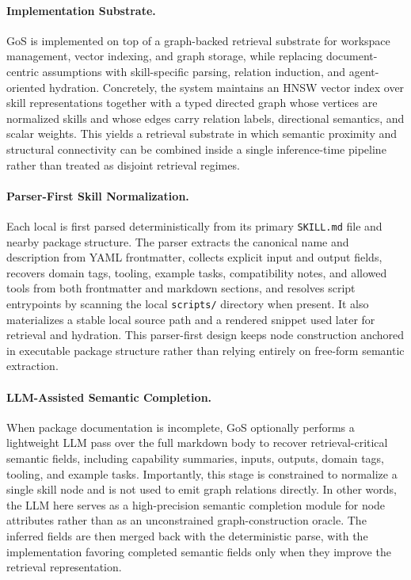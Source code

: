 \paragraph{Implementation Substrate.}
GoS is implemented on top of a graph-backed retrieval substrate for workspace management, vector indexing, and graph storage, while replacing document-centric assumptions with skill-specific parsing, relation induction, and agent-oriented hydration. Concretely, the system maintains an HNSW vector index over skill representations together with a typed directed graph whose vertices are normalized skills and whose edges carry relation labels, directional semantics, and scalar weights. This yields a retrieval substrate in which semantic proximity and structural connectivity can be combined inside a single inference-time pipeline rather than treated as disjoint retrieval regimes.

\paragraph{Parser-First Skill Normalization.}
Each local \skillpackage{} is first parsed deterministically from its primary \texttt{SKILL.md} file and nearby package structure. The parser extracts the canonical name and description from YAML frontmatter, collects explicit input and output fields, recovers domain tags, tooling, example tasks, compatibility notes, and allowed tools from both frontmatter and markdown sections, and resolves script entrypoints by scanning the local \texttt{scripts/} directory when present. It also materializes a stable local source path and a rendered snippet used later for retrieval and hydration. This parser-first design keeps node construction anchored in executable package structure rather than relying entirely on free-form semantic extraction.

\paragraph{LLM-Assisted Semantic Completion.}
When package documentation is incomplete, GoS optionally performs a lightweight LLM pass over the full markdown body to recover retrieval-critical semantic fields, including capability summaries, inputs, outputs, domain tags, tooling, and example tasks. Importantly, this stage is constrained to normalize a single skill node and is not used to emit graph relations directly. In other words, the LLM here serves as a high-precision semantic completion module for node attributes rather than as an unconstrained graph-construction oracle. The inferred fields are then merged back with the deterministic parse, with the implementation favoring completed semantic fields only when they improve the retrieval representation.

